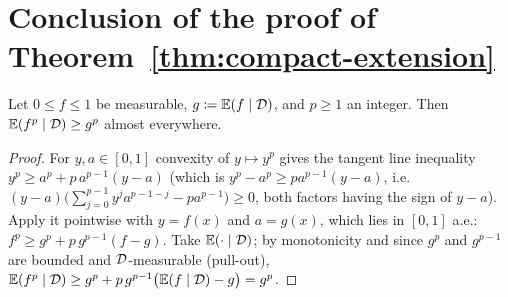 \section{Conclusion of the proof of Theorem~\ref{thm:compact-extension}}

\begin{lemma}
  \label{lem:cond-jensen-power}
  \leanok
  Let $0 \leq f \leq 1$ be measurable, $g \coloneqq \mathbb{E}(f\mid\mathcal{D})$, and $p \geq 1$ an integer.
  Then $\mathbb{E}(f^p \mid \mathcal{D}) \geq g^p$ almost everywhere.
\end{lemma}

\begin{proof}
  For $y, a \in [0,1]$ convexity of $y \mapsto y^p$ gives the tangent line inequality
  $y^p \geq a^p + p\,a^{p-1}(y - a)$ (which is $y^p - a^p \geq p a^{p-1}(y-a)$, i.e.\
  $(y-a)\bigl(\sum_{j=0}^{p-1} y^j a^{p-1-j} - p a^{p-1}\bigr) \geq 0$, both factors having the
  sign of $y - a$).  Apply it pointwise with $y = f(x)$ and $a = g(x)$, which lies in $[0,1]$ a.e.:
  $f^p \geq g^p + p\,g^{p-1}(f - g)$.  Take $\mathbb{E}(\cdot\mid\mathcal{D})$; by monotonicity and since
  $g^p$ and $g^{p-1}$ are bounded and $\mathcal{D}$-measurable (pull-out),
  $\mathbb{E}(f^p\mid\mathcal{D}) \geq g^p + p\,g^{p-1}\bigl(\mathbb{E}(f\mid\mathcal{D}) - g\bigr) = g^p$.
\end{proof}

